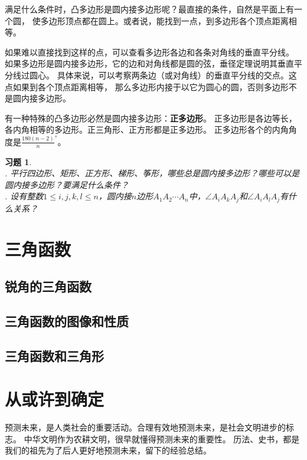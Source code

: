 \documentclass[12pt,UTF8]{ctexbook}
\newtheorem{xt}{习题}[section]
\begin{document}
满足什么条件时，凸多边形是圆内接多边形呢？最直接的条件，自然是平面上有一个圆，
使多边形顶点都在圆上。或者说，能找到一点，到多边形各个顶点距离相等。

如果难以直接找到这样的点，可以查看多边形各边和各条对角线的垂直平分线。
如果多边形是圆内接多边形，它的边和对角线都是圆的弦，垂径定理说明其垂直平分线过圆心。
具体来说，可以考察两条边（或对角线）的垂直平分线的交点。这点如果到各个顶点距离相等，
那么多边形内接于以它为圆心的圆，否则多边形不是圆内接多边形。

有一种特殊的凸多边形必然是圆内接多边形：\textbf{正多边形}。
正多边形是各边等长，各内角相等的多边形。正三角形、正方形都是正多边形。
正多边形各个的内角角度是$\frac{180(n-2)}{n}^\circ$。

\begin{xt}\label{xt:0-4-0}
    \mbox{}\\
    . 平行四边形、矩形、正方形、梯形、筝形，哪些总是圆内接多边形？哪些可以是圆内接多边形？要满足什么条件？\\
    . 设有整数$1 \leqslant i,j,k,l \leqslant n$，圆内接$n$边形$A_1A_2\cdots A_n$中，$\angle A_iA_kA_j$和$\angle A_iA_lA_j$有什么关系？
\end{xt}




\chapter{三角函数}
\section{锐角的三角函数}
\section{三角函数的图像和性质}
\section{三角函数和三角形}


\chapter{从或许到确定}
预测未来，是人类社会的重要活动。合理有效地预测未来，是社会文明进步的标志。
中华文明作为农耕文明，很早就懂得预测未来的重要性。
历法、史书，都是我们的祖先为了后人更好地预测未来，留下的经验总结。
\end{document}
